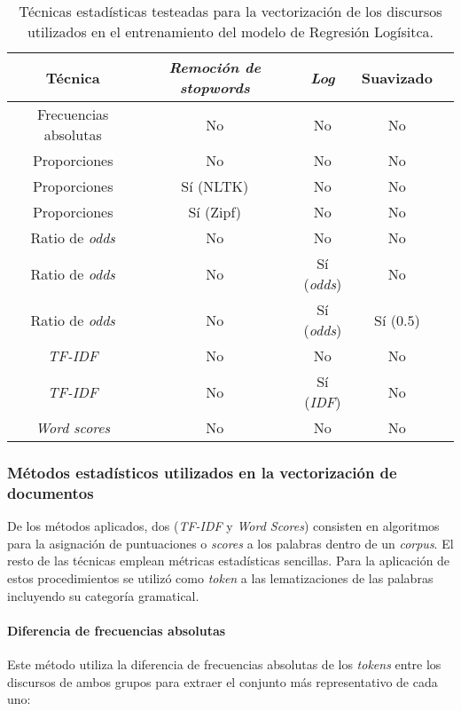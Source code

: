 \begin{table}[ht]
\centering
\begin{tabular}{ |c|c|c|c|c| }
    \hline
    Técnica & \textit{Remoción de stopwords} & \textit{Log} & Suavizado \\
    \hline\hline
    Frecuencias absolutas & No & No & No \\
    \hline
    Proporciones & No & No & No \\
    \hline
    Proporciones & Sí (NLTK) & No & No \\
    \hline
    Proporciones & Sí (Zipf) & No & No \\
    \hline
    Ratio de \textit{odds} & No & No & No \\
    \hline
    Ratio de \textit{odds} & No & Sí (\textit{odds}) & No \\
    \hline
    Ratio de \textit{odds} & No & Sí (\textit{odds}) & Sí ($0.5$) \\
    \hline
    \textit{TF-IDF} & No & No & No \\
    \hline
    \textit{TF-IDF} & No & Sí (\textit{IDF}) & No \\
    \hline
    \textit{Word scores} & No & No & No \\
    \hline
\end{tabular}
\caption{Técnicas estadísticas testeadas para la vectorización de los
discursos utilizados en el entrenamiento del modelo de Regresión Logísitca.}
\label{table-methods-vectorizers}
\end{table}

\subsubsection{Métodos estadísticos utilizados en la vectorización de documentos}
\label{subsubsec-methods-vectorizers}

De los métodos aplicados, dos (\textit{TF-IDF} y \textit{Word Scores}) consisten
en algoritmos para la asignaci\'on de puntuaciones o \textit{scores} a los
palabras dentro de un \textit{corpus}. El resto de las t\'ecnicas emplean
m\'etricas estad\'isticas sencillas. Para la aplicación de estos procedimientos
se utilizó como \textit{token} a las lematizaciones de las palabras incluyendo
su categoría gramatical.


\paragraph{Diferencia de frecuencias absolutas}
\label{paragraph-methods-freq-abs}
Este método utiliza la diferencia de frecuencias absolutas de los \textit{tokens} entre
los discursos de ambos grupos para extraer el conjunto más representativo de
cada uno:

